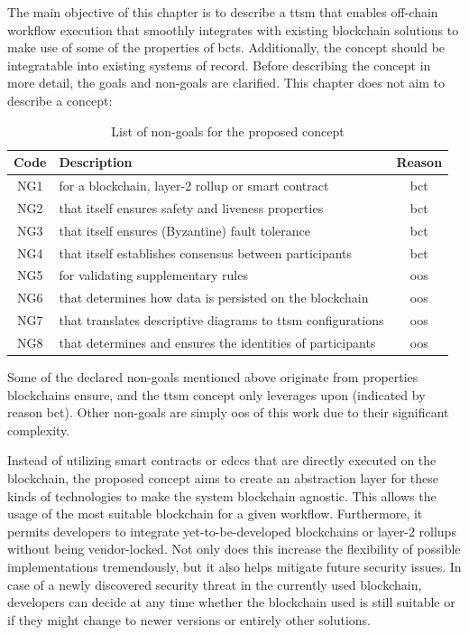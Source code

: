 The main objective of this chapter is to describe a \gls{ttsm} that enables off-chain workflow execution that smoothly integrates with existing blockchain solutions to make use of some of the properties of \glspl{bct}. Additionally, the concept should be integratable into existing systems of record. Before describing the concept in more detail, the goals and non-goals are clarified. This chapter does not aim to describe a concept:

\begin{table}[h]
\centering
\begin{tabular}{|c|l|c|}
    \hline
    \textbf{Code} & \textbf{Description} & \textbf{Reason} \\
    \hline
    NG1 & for a blockchain, layer-2 rollup or smart contract & \gls{bct} \\
    NG2 & that itself ensures safety and liveness properties & \gls{bct} \\
    NG3 & that itself ensures (Byzantine) fault tolerance  & \gls{bct} \\
    NG4 & that itself establishes consensus between participants  & \gls{bct} \\
    NG5 & for validating supplementary rules & \acrshort{oos} \\
    NG6 & that determines how data is persisted on the blockchain & \acrshort{oos} \\
    NG7 & that translates descriptive diagrams to \gls{ttsm} configurations & \acrshort{oos} \\
    NG8 & that determines and ensures the identities of participants & \acrshort{oos} \\
    \hline
\end{tabular}
\caption{List of non-goals for the proposed concept}
\label{tab:ttsm:proposal:non_goals}
\end{table}

Some of the declared non-goals mentioned above originate from properties blockchains ensure, and the \gls{ttsm} concept only leverages upon (indicated by reason \gls{bct}). Other non-goals are simply \gls{oos} of this work due to their significant complexity.

Instead of utilizing smart contracts or \glspl{edcc} that are directly executed on the blockchain, the proposed concept aims to create an abstraction layer for these kinds of technologies to make the system blockchain agnostic. This allows the usage of the most suitable blockchain for a given workflow. Furthermore, it permits developers to integrate yet-to-be-developed blockchains or layer-2 rollups without being vendor-locked. Not only does this increase the flexibility of possible implementations tremendously, but it also helps mitigate future security issues. In case of a newly discovered security threat in the currently used blockchain, developers can decide at any time whether the blockchain used is still suitable or if they might change to newer versions or entirely other solutions.

